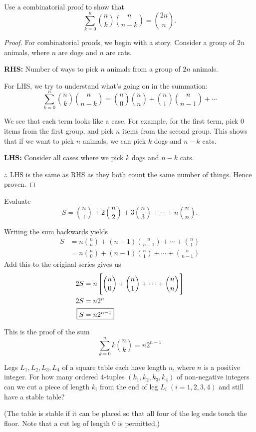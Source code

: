 \begin{prbm} 
Use a combinatorial proof to show that 
\[ \sum_{k=0}^{n} \binom{n}{k}\binom{n}{n-k} = \binom{2n}{n}. \] 
\end{prbm}

\begin{proof}
For combinatorial proofs, we begin with a story. Consider a group of $2n$ animals, where $n$ are dogs and $n$ are cats.

\textbf{RHS:} Number of ways to pick $n$ animals from a group of $2n$ animals.

For LHS, we try to understand what's going on in the summation:
\[ \sum_{k=0}^{n} \binom{n}{k}\binom{n}{n-k} = \binom{n}{0}\binom{n}{n} + \binom{n}{1}\binom{n}{n-1} + \cdots \]

We see that each term looks like a case. For example, for the first term, pick $0$ items from the first group, and pick $n$ items from the second group. This shows that if we want to pick $n$ animals, we can pick $k$ dogs and $n-k$ cats.

\textbf{LHS:} Consider all cases where we pick $k$ dogs and $n-k$ cats.

$\therefore$ LHS is the same as RHS as they both count the same number of things. Hence proven.
\end{proof}
\pagebreak

\begin{prbm} 
Evaluate 
\[ S = {n \choose 1} + 2 {n \choose 2} + 3 {n \choose 3} + \cdots + n {n \choose n}. \] 
\end{prbm}

\begin{solution}
Writing the sum backwards yields 
\begin{align*} 
S &= n {n \choose n} + (n-1) {n \choose n-1} + \cdots + {n \choose 1} \\&= n {n \choose 0} + (n-1) {n \choose 1} + \cdots + {n \choose n-1} 
\end{align*} 
Add this to the original series gives us 
\begin{align*}
2S &= n \left[{n \choose 0} + {n \choose 1} + \cdots + {n \choose n}\right]\\ 
2S &= n 2^n \\
\Aboxed{S &= n 2^{n-1}}
\end{align*}
\end{solution}
This is the proof of the sum
\[ \sum_{k=0}^{n} k \binom{n}{k} = n 2^{n-1} \]
\pagebreak

\begin{prbm}
Legs $L_1, L_2, L_3, L_4$ of a square table each have length $n$, where $n$ is a positive integer. For how many ordered 4-tuples $(k_1, k_2, k_3, k_4)$ of non-negative integers can we cut a piece of length $k_i$ from the end of leg $L_i \; (i=1,2,3,4)$ and still have a stable table?

(The table is stable if it can be placed so that all four of the leg ends touch the floor. Note that a cut leg of length $0$ is permitted.)
\end{prbm}

